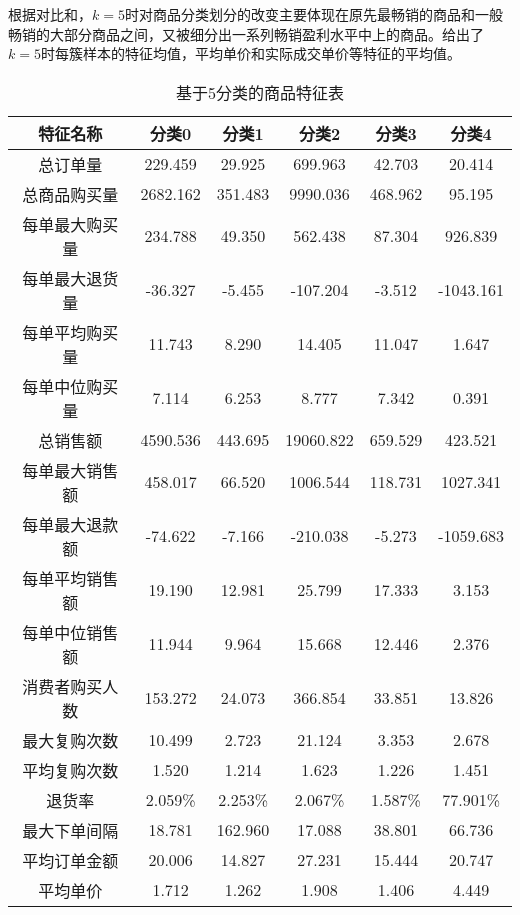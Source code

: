 \documentclass[lang=cn,11pt,a4paper,cite=authoryear]{elegantpaper}
\begin{document}
根据对比和，$k=5$时对商品分类划分的改变主要体现在原先最畅销的商品和一般畅销的大部分商品之间，又被细分出一系列畅销盈利水平中上的商品。给出了$k=5$时每簇样本的特征均值，平均单价和实际成交单价等特征的平均值。
\begin{table}[H]
  \centering
  \caption{基于5分类的商品特征表}
  \begin{tabular}{c|c|c|c|c|c}
    \hline
    \textbf{特征名称} & \textbf{分类0} & \textbf{分类1} & \textbf{分类2} & \textbf{分类3} & \textbf{分类4} \\
    \hline
    总订单量 & 229.459 & 29.925 & 699.963 & 42.703 & 20.414\\
    总商品购买量 & 2682.162 & 351.483 & 9990.036 & 468.962 & 95.195\\
    每单最大购买量 & 234.788 & 49.350 & 562.438 & 87.304 & 926.839\\
    每单最大退货量 & -36.327 & -5.455 & -107.204 & -3.512 & -1043.161\\
    每单平均购买量 & 11.743 & 8.290 & 14.405 & 11.047 & 1.647\\
    每单中位购买量 & 7.114  & 6.253 & 8.777 & 7.342 & 0.391\\
    总销售额 & 4590.536 & 443.695 & 19060.822 & 659.529 & 423.521\\
    每单最大销售额 & 458.017 & 66.520 & 1006.544 & 118.731 & 1027.341\\
    每单最大退款额 & -74.622 & -7.166 & -210.038 & -5.273 & -1059.683\\
    每单平均销售额 & 19.190 & 12.981 & 25.799 & 17.333 & 3.153\\
    每单中位销售额 & 11.944 & 9.964 & 15.668 & 12.446 & 2.376\\
    消费者购买人数 & 153.272 & 24.073 & 366.854 & 33.851 & 13.826\\
    最大复购次数 & 10.499 & 2.723 & 21.124 & 3.353 & 2.678\\
    平均复购次数 & 1.520 & 1.214 & 1.623 & 1.226 & 1.451\\
    退货率 & 2.059\% & 2.253\% & 2.067\% & 1.587\% & 77.901\%\\
    最大下单间隔 & 18.781 & 162.960 & 17.088 & 38.801 & 66.736\\
    平均订单金额 & 20.006 & 14.827 & 27.231 & 15.444 & 20.747\\
    平均单价 & 1.712 & 1.262 & 1.908 & 1.406 & 4.449\\
    \hline
  \end{tabular}
  \label{基于5分类的商品特征表}
\end{table}
\end{document}
